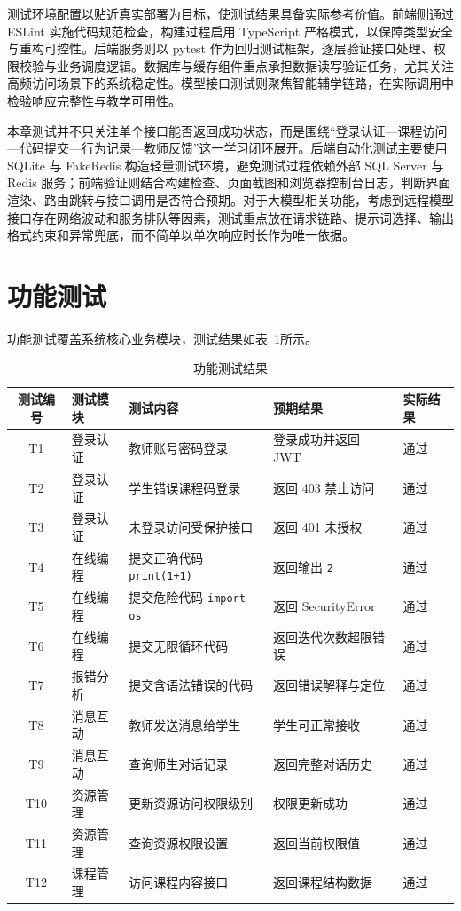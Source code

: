 测试环境配置以贴近真实部署为目标，使测试结果具备实际参考价值。前端侧通过 ESLint 实施代码规范检查，构建过程启用 TypeScript 严格模式，以保障类型安全与重构可控性。后端服务则以 pytest 作为回归测试框架，逐层验证接口处理、权限校验与业务调度逻辑。数据库与缓存组件重点承担数据读写验证任务，尤其关注高频访问场景下的系统稳定性。模型接口测试则聚焦智能辅学链路，在实际调用中检验响应完整性与教学可用性。

本章测试并不只关注单个接口能否返回成功状态，而是围绕“登录认证—课程访问—代码提交—行为记录—教师反馈”这一学习闭环展开。后端自动化测试主要使用 SQLite 与 FakeRedis 构造轻量测试环境，避免测试过程依赖外部 SQL Server 与 Redis 服务；前端验证则结合构建检查、页面截图和浏览器控制台日志，判断界面渲染、路由跳转与接口调用是否符合预期。对于大模型相关功能，考虑到远程模型接口存在网络波动和服务排队等因素，测试重点放在请求链路、提示词选择、输出格式约束和异常兜底，而不简单以单次响应时长作为唯一依据。

\section{功能测试}
功能测试覆盖系统核心业务模块，测试结果如表~\ref{tab:func-test}所示。

\begin{table}[htbp]
  \centering
  \caption{功能测试结果}
  \label{tab:func-test}
  \begin{tabular}{cp{3cm}p{4cm}p{3cm}p{3cm}}
    \toprule
    测试编号 & 测试模块 & 测试内容 & 预期结果 & 实际结果 \\
    \midrule
    T1 & 登录认证 & 教师账号密码登录 & 登录成功并返回 JWT & 通过 \\
    T2 & 登录认证 & 学生错误课程码登录 & 返回 403 禁止访问 & 通过 \\
    T3 & 登录认证 & 未登录访问受保护接口 & 返回 401 未授权 & 通过 \\
    T4 & 在线编程 & 提交正确代码 \texttt{print(1+1)} & 返回输出 \texttt{2} & 通过 \\
    T5 & 在线编程 & 提交危险代码 \texttt{import os} & 返回 SecurityError & 通过 \\
    T6 & 在线编程 & 提交无限循环代码 & 返回迭代次数超限错误 & 通过 \\
    T7 & 报错分析 & 提交含语法错误的代码 & 返回错误解释与定位 & 通过 \\
    T8 & 消息互动 & 教师发送消息给学生 & 学生可正常接收 & 通过 \\
    T9 & 消息互动 & 查询师生对话记录 & 返回完整对话历史 & 通过 \\
    T10 & 资源管理 & 更新资源访问权限级别 & 权限更新成功 & 通过 \\
    T11 & 资源管理 & 查询资源权限设置 & 返回当前权限值 & 通过 \\
    T12 & 课程管理 & 访问课程内容接口 & 返回课程结构数据 & 通过 \\
    \bottomrule
  \end{tabular}
\end{table}

